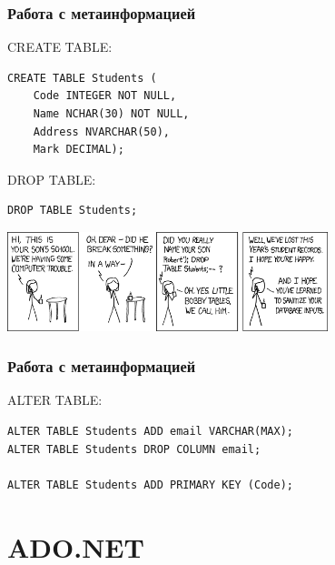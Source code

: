\documentclass{../../slides-style}
\begin{document}
    \begin{frame}[fragile]
        \frametitle{Работа с метаинформацией}
        \begin{small}
            CREATE TABLE:
            \begin{verbatim}
CREATE TABLE Students (
    Code INTEGER NOT NULL,
    Name NCHAR(30) NOT NULL,
    Address NVARCHAR(50),
    Mark DECIMAL);
            \end{verbatim}

            \vspace{3mm}
            DROP TABLE:
            \begin{verbatim}
DROP TABLE Students;
            \end{verbatim}
        \end{small}

        \begin{center}
            \includegraphics[width=0.7\textwidth]{bobbyTables.png}
        \end{center}
    \end{frame}

    \begin{frame}[fragile]
        \frametitle{Работа с метаинформацией}
        ALTER TABLE:
        \begin{verbatim}
ALTER TABLE Students ADD email VARCHAR(MAX);
ALTER TABLE Students DROP COLUMN email;

ALTER TABLE Students ADD PRIMARY KEY (Code);

        \end{verbatim}
    \end{frame}

    \section{ADO.NET}
\end{document}
